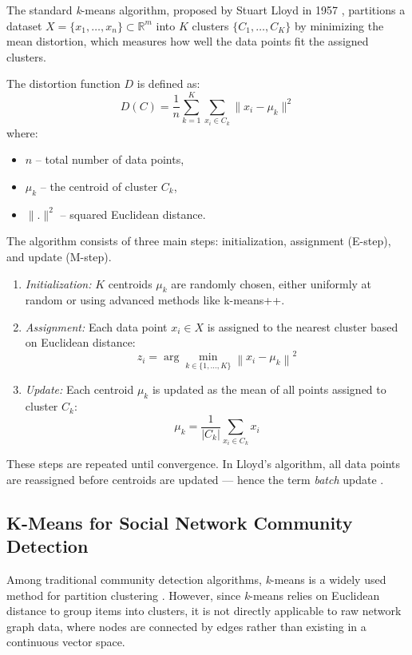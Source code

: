 \documentclass[conference]{IEEEtran}
\begin{document}
The standard \textit{k}-means algorithm, proposed by Stuart Lloyd in 1957 \cite{lloyd1982least}, partitions a dataset ${X} = \{x_1, \ldots, x_n\} \subset \mathbb{R}^m$ into $K$ clusters $\{C_1, \ldots, C_K\}$ by minimizing the mean distortion, which measures how well the data points fit the assigned clusters.

The distortion function $D$ is defined as:
\begin{equation}
    D(C) = \frac{1}{n}\sum_{k=1}^K \sum_{x_i \in C_k} \|x_i - \mu_k\|^2
\end{equation}
where: 
\begin{itemize}
    \item $n$ – total number of data points,
    \item $\mu_k$ – the centroid of cluster $C_k$,
    \item $\|.\|^2$ – squared Euclidean distance.
\end{itemize}

The algorithm consists of three main steps: initialization, assignment (E-step), and update (M-step).
\begin{enumerate}
    \item \textit{Initialization:} $K$ centroids $\mu_k$ are randomly chosen, either uniformly at random or using advanced methods like k-means++.
    \item \textit{Assignment:} Each data point $x_i \in X$ is assigned to the nearest cluster based on Euclidean distance:
    \begin{equation}
        z_i = \arg\min_{k \in \{1, \dots, K\}} \left\| x_i - \mu_k \right\|^2
    \end{equation}
    \item \textit{Update:} Each centroid $\mu_k$ is updated as the mean of all points assigned to cluster $C_k$:
    \begin{equation}
        \mu_k = \frac{1}{\left| C_k \right|} \sum_{x_i \in C_k} x_i
    \end{equation}
\end{enumerate}

These steps are repeated until convergence. In Lloyd’s algorithm, all data points are reassigned before centroids are updated — hence the term \textit{batch} update \cite{slonim2013hartigan}\cite{lloyd1982least}.

\subsection*{K-Means for Social Network Community Detection}
Among traditional community detection algorithms, \textit{k}-means is a widely used method for partition clustering \cite{JAVED201887}. However, since \textit{k}-means relies on Euclidean distance to group items into clusters, it is not directly applicable to raw network graph data, where nodes are connected by edges rather than existing in a continuous vector space. 
\end{document}
